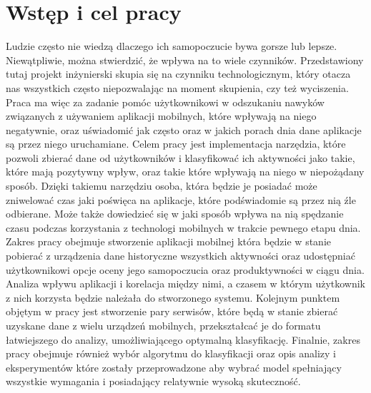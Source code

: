 \documentclass[a4paper,twoside,12pt]{book}
\newcounter{stronyPozaNumeracja}
\begin{document}
\vfill

 

\cleardoublepage


\pagestyle{tylkoNumeryStron}
\tableofcontents

\setcounter{stronyPozaNumeracja}{\value{page}}
\mainmatter
\pagestyle{NumeryStronNazwyRozdzialow}


\chapter{Wstęp i cel pracy}
Ludzie często nie wiedzą dlaczego ich samopoczucie bywa gorsze lub lepsze. Niewątpliwie, można stwierdzić, że wpływa na to wiele czynników. Przedstawiony tutaj projekt inżynierski skupia się na czynniku technologicznym, który otacza nas wszystkich często niepozwalając na moment skupienia, czy też wyciszenia. Praca ma więc za zadanie pomóc użytkownikowi w odszukaniu nawyków związanych z używaniem aplikacji mobilnych, które wpływają na niego negatywnie, oraz uświadomić jak często oraz w jakich porach dnia dane aplikacje są przez niego uruchamiane.     
Celem pracy jest implementacja narzędzia, które pozwoli zbierać dane od użytkowników i klasyfikować ich aktywności jako takie, które mają pozytywny wpływ, oraz takie które wpływają na niego w niepożądany sposób. Dzięki takiemu narzędziu osoba, która będzie je posiadać może zniwelować czas jaki poświęca na aplikacje, które podświadomie są przez nią źle odbierane. Może także dowiedzieć się w jaki sposób wpływa na nią spędzanie czasu podczas korzystania z technologi mobilnych w trakcie pewnego etapu dnia.
Zakres pracy obejmuje stworzenie aplikacji mobilnej która będzie w stanie pobierać z urządzenia dane historyczne wszystkich aktywności oraz udostępniać użytkownikowi opcje oceny jego samopoczucia oraz produktywności w ciągu dnia. Analiza wpływu aplikacji i korelacja między nimi, a czasem w którym użytkownik z nich korzysta będzie należała do stworzonego systemu. Kolejnym punktem objętym w pracy jest stworzenie pary serwisów, które będą w stanie zbierać uzyskane dane z wielu urządzeń mobilnych, przekształcać je do formatu łatwiejszego do analizy, umożliwiającego optymalną klasyfikację. Finalnie, zakres pracy obejmuje również wybór algorytmu do klasyfikacji oraz opis analizy i eksperymentów które zostały przeprowadzone aby wybrać model spełniający wszystkie wymagania i posiadający relatywnie wysoką skuteczność. 
\end{document}
